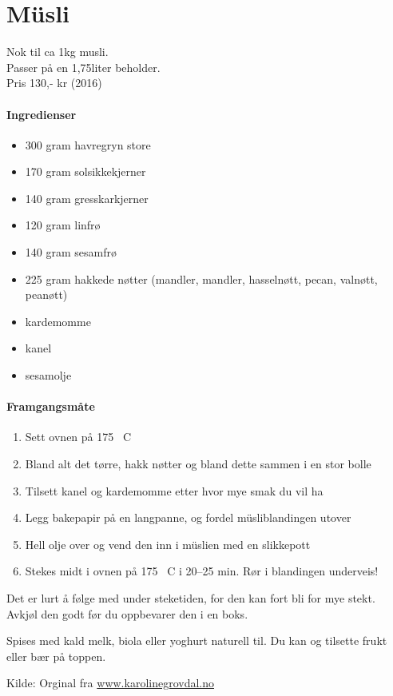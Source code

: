 \section{Müsli}
Nok til ca 1kg musli.\\ Passer på en 1,75liter beholder.\\
Pris 130,- kr (2016)

\paragraph{Ingredienser}
\begin{itemize}[noitemsep]
  \item 300 gram havregryn store
  \item 170 gram solsikkekjerner
  \item 140 gram gresskarkjerner
  \item 120 gram linfrø
  \item 140 gram sesamfrø
  \item 225 gram hakkede nøtter (mandler, mandler, hasselnøtt, pecan, valnøtt, peanøtt)
  \item kardemomme
  \item kanel
  \item sesamolje
\end{itemize}

\paragraph{Framgangsmåte}
\begin{enumerate}[noitemsep]
  \item	Sett ovnen på 175 \degree~C
  \item	Bland alt det tørre, hakk nøtter og bland dette sammen i en stor bolle
  \item	Tilsett kanel og kardemomme etter hvor mye smak du vil ha
  \item	Legg bakepapir på en langpanne, og fordel müsliblandingen utover
  \item	Hell olje over og vend den inn i müslien med en slikkepott
  \item	Stekes midt i ovnen på 175 \degree~C i 20--25 min. Rør i blandingen underveis!
\end{enumerate}


Det er lurt å følge med under steketiden, for den kan fort bli for mye stekt.
Avkjøl den godt før du oppbevarer den i en boks.

Spises med kald melk, biola eller yoghurt naturell til. Du kan og tilsette frukt eller bær på toppen.

Kilde: Orginal fra \href{http://www.karolinegrovdal.no/?p=305}{www.karolinegrovdal.no}
